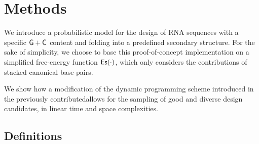 \section{Methods}
\label{sec:methods}



We introduce a probabilistic model for the design of RNA sequences with a specific ${\sf{G}}+{\sf{C}}$ content and folding into a predefined secondary structure.
For the sake of simplicity, we choose to base this proof-of-concept implementation on a simplified free-energy function $\text{{\sf Es}}(\cdot)$, which only considers the contributions of 
stacked canonical base-pairs. 

We show how a modification of the dynamic programming scheme introduced in the previously contributed\RNAmutants allows for the sampling of good and diverse design candidates, in linear time and space complexities.


%
%
\subsection{Definitions}

